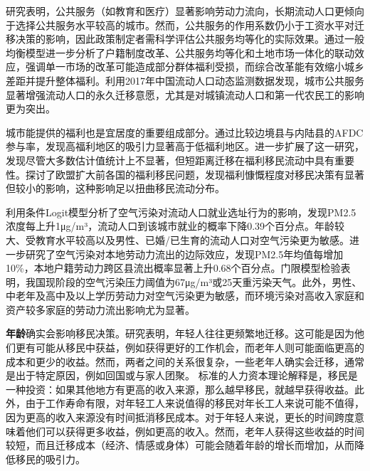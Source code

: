 \documentclass[a4paper,12pt,oneside, fontset=mac]{ctexbook} %
\begin{document}
\cite{XiaYiRanChengShiJianDeMengMuSanQianGongGongFuWuYingXiangLaoDongLiLiuXiangDeJingYanYanJiu2015}研究表明，公共服务（如教育和医疗）显著影响劳动力流向，长期流动人口更倾向于选择公共服务水平较高的城市。然而，公共服务的作用系数仍小于工资水平对迁移决策的影响，因此政策制定者需科学评估公共服务均等化的实际效果。\cite{GuoDongMeiChengXiangRongHeDeShouRuHeFuLiXiaoYingYanJiuJiYuYaoSuPeiZhiDeShiJiao2023}通过一般均衡模型进一步分析了户籍制度改革、公共服务均等化和土地市场一体化的联动效应，强调单一市场的改革可能造成部分群体福利受损，而综合改革能有效缩小城乡差距并提升整体福利。\cite{LiuJinFengChengShiGongGongFuWuDuiLiuDongRenKouYongJiuQianYiYiYuanDeYingXiang2019}利用2017年中国流动人口动态监测数据发现，城市公共服务显著增强流动人口的永久迁移意愿，尤其是对城镇流动人口和第一代农民工的影响更为突出。

城市能提供的福利也是宜居度的重要组成部分。\cite{benjaminImportingPoorWelfare2004}通过比较边境县与内陆县的AFDC参与率，发现高福利地区的吸引力显著高于低福利地区。\cite{mckinnishWelfareinducedMigrationState2007}进一步扩展了这一研究，发现尽管大多数估计值统计上不显著，但短距离迁移在福利移民流动中具有重要性。\cite{degiorgiWelfareMigrationEurope2009}探讨了欧盟扩大前各国的福利移民问题，发现福利慷慨程度对移民决策有显著但较小的影响，这种影响足以扭曲移民流动分布。

\cite{SunWeiZengKongQiWuRanYuLaoDongLiDeKongJianLiuDongJiYuLiuDongRenKouJiuYeXuanZhiXingWeiDeYanJiu2019}利用条件Logit模型分析了空气污染对流动人口就业选址行为的影响，发现PM2.5浓度每上升1μg/m³，流动人口到该城市就业的概率下降0.39个百分点。年龄较大、受教育水平较高以及男性、已婚/已生育的流动人口对空气污染更为敏感。\cite{ZhangYanKongQiWuRanDuiBenDiLaoDongLiLiuChuDeYingXiangYanJiu2023}进一步研究了空气污染对本地劳动力流出的边际效应，发现PM2.5年均值每增加10\%，本地户籍劳动力跨区县流出概率显著上升0.68个百分点。门限模型检验表明，我国现阶段的空气污染压力阈值为67μg/m³或25天重污染天气。此外，男性、中老年及高中及以上学历劳动力对空气污染更为敏感，而环境污染对高收入家庭和资产较多家庭的劳动力流出影响尤为显著。





\textbf{年龄}确实会影响移民决策。研究表明，年轻人往往更频繁地迁移。这可能是因为他们更有可能从移民中获益，例如获得更好的工作机会，而老年人则可能面临更高的成本和更少的收益。然而，两者之间的关系很复杂，一些老年人确实会迁移，通常是出于特定原因，例如回国或与家人团聚。
标准的人力资本理论解释是，移民是一种投资：如果其他地方有更高的收入来源，那么越早移民，就越早获得收益。此外，由于工作寿命有限，对年轻工人来说值得的移民对年长工人来说可能不值得，因为更高的收入来源没有时间抵消移民成本。对于年轻人来说，更长的时间跨度意味着他们可以获得更多收益，例如更高的收入。然而，老年人获得这些收益的时间较短，而且迁移成本（经济、情感或身体）可能会随着年龄的增长而增加，从而降低移民的吸引力。
\end{document}
